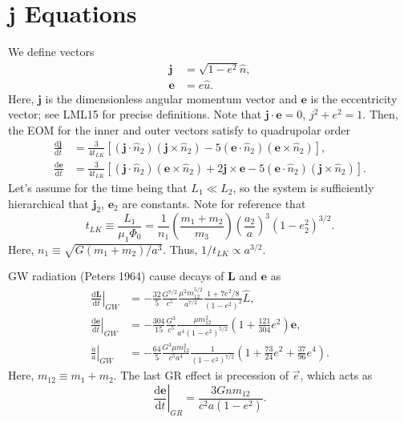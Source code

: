 \documentclass[11pt,
        usenames, %
        dvipsnames %
    ]{article}
\newcommand*{\rd}[2]{\frac{\mathrm{d}#1}{\mathrm{d}#2}}
\newcommand*{\bm}[1]{\boldsymbol{\mathbf{#1}}}
\newcommand*{\at}[1]{\left.#1\right|}
\newcommand*{\p}[1]{\left(#1\right)}
\newcommand*{\s}[1]{\left[#1\right]}
\begin{document}
\appendix

\section{$\bm{j}$ Equations}

We define vectors
\begin{align}
    \bm{j} &= \sqrt{1 - e^2}\hat{n},\\
    \bm{e} &= e\hat{u}.
\end{align}
Here, $\bm{j}$ is the dimensionless angular momentum vector and $\bm{e}$ is the
eccentricity vector; see LML15 for precise definitions. Note that $\bm{j} \cdot
\bm{e} = 0$, $j^2 + e^2 = 1$. Then, the EOM for the inner and outer vectors
satisfy to quadrupolar order
\begin{align}
    \rd{\bm{j}}{t} &= \frac{3}{4t_{LK}} \s{
        \p{\bm{j} \cdot \hat{n}_2} \p{\bm{j} \times \hat{n}_2}
        - 5\p{\bm{e} \cdot \hat{n}_2}\p{\bm{e} \times \hat{n}_2}
        },\\
    \rd{\bm{e}}{t} &= \frac{3}{4t_{LK}} \s{
        \p{\bm{j} \cdot \hat{n}_2} \p{\bm{e} \times \hat{n}_2}
        + 2\bm{j} \times \bm{e}
        - 5\p{\bm{e} \cdot \hat{n}_2}\p{\bm{j} \times \hat{n}_2}
        }.
\end{align}
Let's assume for the time being that $L_1 \ll L_2$, so the system is
sufficiently hierarchical that $\bm{j}_2$, $\bm{e}_2$ are constants. Note for
reference that
\begin{equation}
    t_{LK} \equiv \frac{L_1}{\mu_1 \Phi_0}
        = \frac{1}{n_1}\p{\frac{m_1 + m_2}{m_3}}
            \p{\frac{a_2}{a}}^3
            \p{1 - e_2^2}^{3/2}.
\end{equation}
Here, $n_1 \equiv \sqrt{G\p{m_1 + m_2}/a^3}$. Thus, $1 / t_{LK} \propto
a^{3/2}$.

GW radiation (Peters 1964) cause decays of $\bm{L}$ and $\bm{e}$ as
\begin{align}
    \at{\rd{\bm{L}}{t}}_{GW} &= -\frac{32}{5}\frac{G^{7/2}}{c^5}
        \frac{\mu^2 m_{12}^{5/2}}{a^{7/2}}
        \frac{1 + 7e^2/8}{\p{1 - e^2}^2}\hat{L},\\
    \at{\rd{\bm{e}}{t}}_{GW} &= -\frac{304}{15} \frac{G^3}{c^5}
        \frac{\mu m_{12}^2}{a^4\p{1 - e^2}^{5/2}}\p{1 + \frac{121}{304}
            e^2}\bm{e},\\
    \at{\frac{\dot{a}}{a}}_{GW} &= -\frac{64}{5} \frac{G^3 \mu m_{12}^2}{c^5a^4}
        \frac{1}{\p{1 - e^2}^{7/2}}\p{1 + \frac{73}{24}e^2
            + \frac{37}{96}e^4}.
\end{align}
Here, $m_{12} \equiv m_1 + m_2$. The last GR effect is precession of $\vec{e}$,
which acts as
\begin{equation}
    \at{\rd{\bm{e}}{t}}_{GR} = \frac{3Gnm_{12}}{c^2a\p{1 - e^2}}.
\end{equation}
\end{document}
